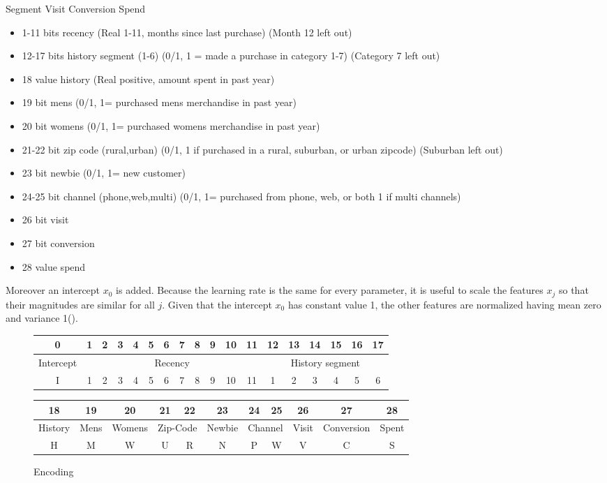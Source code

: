 \documentclass[10pt,twocolumn,letterpaper]{article}
\begin{document}
Segment
Visit
Conversion
Spend

\begin{itemize}
\item 1-11 bits recency (Real 1-11, months since last purchase)  (Month 12 left out)
\item 12-17 bits history segment (1-6) (0/1, 1 = made a purchase in category 1-7)   (Category 7 left out)
\item  18 value history (Real positive, amount spent in past year)
\item  19 bit mens (0/1, 1= purchased mens merchandise in past year)
\item  20 bit womens (0/1, 1= purchased womens merchandise in past year)
\item  21-22 bit zip code (rural,urban) (0/1, 1 if purchased in a rural, suburban, or urban zipcode)  (Suburban left out)
\item  23 bit newbie (0/1, 1= new customer)
\item  24-25 bit channel (phone,web,multi) (0/1, 1= purchased from phone, web, or both 1 if multi channels)
\item 26 bit visit
\item 27 bit conversion
\item 28 value spend
\end{itemize}

Moreover an intercept $x_0$ is added.
Because the learning rate is the same for every parameter, it is useful to scale the features $x_j$ so that their magnitudes are similar for all $j$. Given that the intercept $x_0$ has constant value 1, the other features are normalized having mean zero and variance 1(\cite{elkan11}).

\begin{figure*}[tb]
	\centering
 	\begin{tabular}{|c|c|c|c|c|c|c|c|c|c|c|c|c|c|c|c|c|c|}
  	\hline
  	 0&1&2&3&4&5&6&7&8&9&10&11&12&13&14&15&16&17\\ 
  	 \hline
  	 Intercept&\multicolumn{11}{|c|}{Recency}&\multicolumn{6}{|c|}{History segment}\\
  	 \hline
		I&1&2&3&4&5&6&7&8&9&10&11&1&2&3&4&5&6\\ 
  	\hline
 		\end{tabular}
 		


 		\begin{tabular}{|c|c|c|c|c|c|c|c|c|c|c|}
  	\hline
  	 18&19&20&21&22&23&24&25&26&27&28\\ 
  	 \hline
  	 History&Mens&Womens&\multicolumn{2}{|c|}{Zip-Code}&Newbie&\multicolumn{2}{|c|}{Channel}&Visit&Conversion&Spent\\
  	 \hline
		H&M&W&U&R&N&P&W&V&C&S\\ 
  	\hline
 		\end{tabular}
\caption{Encoding}
    \label{encoding}
\end{figure*}
\end{document}
